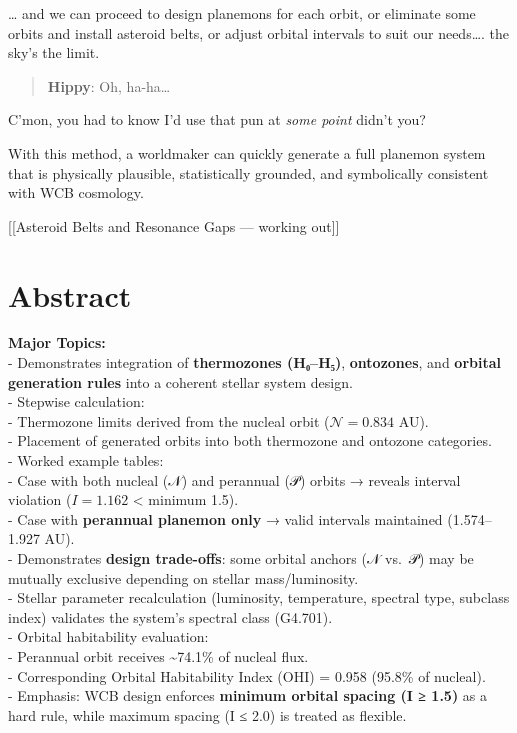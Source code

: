 \documentclass[
  letterpaper,
]{book}
\begin{document}
\ldots{} and we can proceed to design planemons for each orbit, or
eliminate some orbits and install asteroid belts, or adjust orbital
intervals to suit our needs\ldots. the sky's the limit.

\begin{quote}
\textbf{Hippy}: Oh, ha-ha\ldots{}
\end{quote}

C'mon, you had to know I'd use that pun at \emph{some point} didn't you?

With this method, a worldmaker can quickly generate a full planemon
system that is physically plausible, statistically grounded, and
symbolically consistent with WCB cosmology.

{[}{[}Asteroid Belts and Resonance Gaps --- working out{]}{]}

\section{Abstract}\label{abstract-15}

\textbf{Major Topics:}\\
- Demonstrates integration of \textbf{thermozones (H₀--H₅)},
\textbf{ontozones}, and \textbf{orbital generation rules} into a
coherent stellar system design.\\
- Stepwise calculation:\\
- Thermozone limits derived from the nucleal orbit (\(𝒩 = 0.834\) AU).\\
- Placement of generated orbits into both thermozone and ontozone
categories.\\
- Worked example tables:\\
- Case with both nucleal (𝒩) and perannual (𝒫) orbits → reveals interval
violation (\(I = 1.162\) \textless{} minimum 1.5).\\
- Case with \textbf{perannual planemon only} → valid intervals
maintained (1.574--1.927 AU).\\
- Demonstrates \textbf{design trade-offs}: some orbital anchors (𝒩
vs.~𝒫) may be mutually exclusive depending on stellar mass/luminosity.\\
- Stellar parameter recalculation (luminosity, temperature, spectral
type, subclass index) validates the system's spectral class (G4.701).\\
- Orbital habitability evaluation:\\
- Perannual orbit receives \textasciitilde74.1\% of nucleal flux.\\
- Corresponding Orbital Habitability Index (OHI) = 0.958 (95.8\% of
nucleal).\\
- Emphasis: WCB design enforces \textbf{minimum orbital spacing (I ≥
1.5)} as a hard rule, while maximum spacing (I ≤ 2.0) is treated as
flexible.
\end{document}
